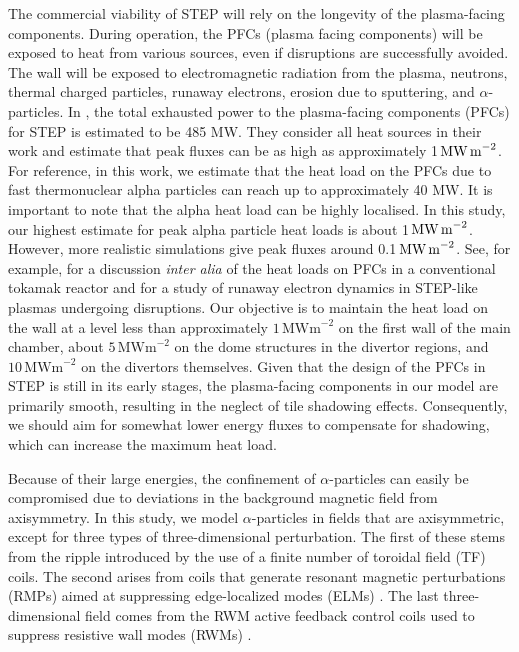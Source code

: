 \documentclass[10pt, a4paper, twoside]{article}
\begin{document}
The commercial viability of STEP will rely on the longevity of the plasma-facing components. During operation, the PFCs (plasma facing components) will be exposed to heat from various sources, even if disruptions are successfully avoided. The wall will be exposed to electromagnetic radiation from the plasma, neutrons, thermal charged particles, runaway electrons, erosion due to sputtering, and $\alpha$-particles.
In \cite{vaccaro2024}, the total exhausted power to the plasma-facing components (PFCs) for STEP is estimated to be 485 MW. They consider all heat sources in their work and estimate that peak fluxes can be as high as approximately 1\,$\text{MW\,m}^{-2}$. For reference, in this work, we estimate that the heat load on the PFCs due to fast thermonuclear alpha particles can reach up to approximately 40 MW. It is important to note that the alpha heat load can be highly localised. In this study, our highest estimate for peak alpha particle heat loads is about 1\,$\text{MW\,m}^{-2}$. However, more realistic simulations give peak fluxes around 0.1\,$\text{MW\,m}^{-2}$.
See, for example, \cite{bachmann2018} for a discussion {\it inter alia} of the heat loads on PFCs in a conventional tokamak reactor and \cite{Berger2022} for a study of runaway electron dynamics in STEP-like plasmas undergoing disruptions. Our objective is to maintain the heat load on the wall at a level less than approximately $1\, \text{MWm}^{-2}$ on the first wall of the main chamber, about $5\, \text{MWm}^{-2}$ on the dome structures in the divertor regions, and $10\, \text{MWm}^{-2}$ on the divertors themselves. Given that the design of the PFCs in STEP is still in its early stages, the plasma-facing components in our model are primarily smooth, resulting in the neglect of tile shadowing effects. Consequently, we should aim for somewhat lower energy fluxes to compensate for shadowing, which can increase the maximum heat load.

Because of their large energies, the confinement of $\alpha$-particles can easily be compromised due to deviations in the background magnetic field from axisymmetry.  In this study, we model $\alpha$-particles in fields that are axisymmetric, except for three types of three-dimensional perturbation. The first of these stems from the ripple introduced by the use of a finite number of toroidal field (TF) coils. The second arises from coils that generate resonant magnetic perturbations (RMPs) aimed at suppressing edge-localized modes (ELMs) \cite{zohm1996}. The last three-dimensional field comes from the RWM active feedback control coils used to suppress resistive wall modes (RWMs) \cite{xia2023}.
\end{document}
